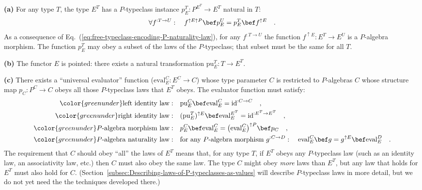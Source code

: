 \textbf{(a)} For any type $T$, the type $E^{T}$ has a $P$-typeclass
instance $p_{E}^{T}:P^{E^{T}}\rightarrow E^{T}$ natural in $T$:
\begin{equation}
\forall f^{:T\rightarrow U}:\quad f^{\uparrow E\uparrow P}\bef p_{E}^{U}=p_{E}^{T}\bef f^{\uparrow E}\quad.\label{eq:free-typeclass-encoding-P-naturality-law}
\end{equation}
 As a consequence of Eq.~(\ref{eq:free-typeclass-encoding-P-naturality-law}),
for any $f^{:T\rightarrow U}$ the function $f^{\uparrow E}:E^{T}\rightarrow E^{U}$
is a $P$-algebra morphism. The function $p_{E}^{T}$ may obey a subset
of the laws of the $P$-typeclass; that subset must be the same for
all $T$.

\textbf{(b)} The functor $E$ is pointed:
there exists a natural transformation $\text{pu}_{E}^{T}:T\rightarrow E^{T}$.

\textbf{(c)} There exists a \textsf{``}universal evaluator\textsf{''} function ($\text{eval}_{E}^{C}:E^{C}\rightarrow C$)
whose type parameter $C$ is restricted to $P$-algebras $C$ whose
structure map $p_{C}:P^{C}\rightarrow C$ obeys all those $P$-typeclass
laws that $E^{T}$ obeys. The evaluator function must satisfy:
\begin{align}
{\color{greenunder}\text{left identity law}:}\quad & \text{pu}_{E}^{C}\bef\text{eval}_{E}^{C}=\text{id}^{:C\rightarrow C}\quad,\label{eq:free-typeclass-encoding-left-identity-law}\\
{\color{greenunder}\text{right identity law}:}\quad & (\text{pu}_{E}^{T})^{\uparrow E}\bef\text{eval}_{E}^{E^{T}}=\text{id}^{:E^{T}\rightarrow E^{T}}\quad,\label{eq:free-typeclass-encoding-right-identity-law}\\
{\color{greenunder}P\text{-algebra morphism law}:}\quad & p_{E}^{C}\bef\text{eval}_{E}^{C}=\big(\text{eval}_{E}^{C}\big)^{\uparrow P}\bef p_{C}\quad,\nonumber \\
{\color{greenunder}P\text{-algebra naturality law}:}\quad & \text{for any }P\text{-algebra morphism }g^{:C\rightarrow D}:\quad\text{eval}_{E}^{C}\bef g=g^{\uparrow E}\bef\text{eval}_{E}^{D}\quad.\label{eq:free-typeclass-encoding-P-algebra-naturality-law}
\end{align}
The requirement that $C$ should obey \textsf{``}all\textsf{''} the laws of $E^{T}$
means that, for any type $T$, if $E^{T}$ obeys any $P$-typeclass
law (such as an identity law, an associativity law, etc.) then $C$
must also obey the same law. The type $C$ might obey \emph{more}
laws than $E^{T}$, but any law that holds for $E^{T}$ must also
hold for $C$. (Section~\ref{subsec:Describing-laws-of-P-typeclasses-as-values}
will describe $P$-typeclass laws in more detail, but we do not yet
need the the techniques developed there.)

